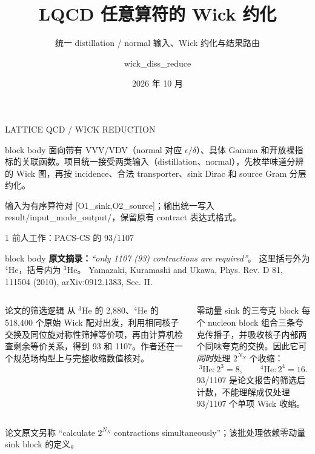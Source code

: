\documentclass[aspectratio=169,UTF8,fontset=fandol]{ctexbeamer}
\title{LQCD 任意算符的 Wick 约化}
\subtitle{统一 distillation / normal 输入、Wick 约化与结果路由}
\author{wick\_diss\_reduce}
\date{2026 年 10 月}
\newcommand{\smallnote}[1]{{\scriptsize\color{Muted}#1}}
\begin{document}
\begin{frame}[plain]
\vspace{0.75cm}
{\color{Teal}\small LATTICE QCD \quad / \quad WICK REDUCTION}\par
\vspace{0.45cm}
{\color{Ink}\inserttitle\par}
\vspace{0.25cm}
{\color{Muted}\insertsubtitle\par}
\vspace{0.65cm}
\begin{beamercolorbox}[sep=0.7em,wd=\linewidth]{block body}
面向带有 VVV/VDV（normal 对应 \(\epsilon/\delta\)）、具体 Gamma 和开放裸指标的关联函数。项目统一接受两类输入（distillation、normal），先枚举味道分辨的 Wick 图，再按 incidence、合法 transporter、sink Dirac 和 source Gram 分层约化。
\end{beamercolorbox}
\vfill
\smallnote{输入为有序算符对 [O1\_sink,O2\_source]；输出统一写入 result/input\_mode\_output/，保留原有 contract 表达式格式。}
\end{frame}
\begin{frame}{1 前人工作：PACS-CS 的 93/1107}
\small
\begin{beamercolorbox}[sep=0.55em,wd=\linewidth]{block body}
\textbf{原文摘录：}\textit{``only 1107 (93) contractions are required''}。
这里括号外为 \({}^4\mathrm{He}\)，括号内为 \({}^3\mathrm{He}\)。
\smallnote{Yamazaki, Kuramashi and Ukawa, Phys. Rev. D 81, 111504 (2010), arXiv:0912.1383, Sec. II.}
\end{beamercolorbox}
\vspace{0.3em}
\begin{columns}[T,onlytextwidth]
\begin{block}{论文的筛选逻辑}
\small
从 \({}^3\mathrm{He}\) 的 2,880、\({}^4\mathrm{He}\) 的 518,400 个原始 Wick 配对出发，利用相同核子交换及同位旋对称性筛掉等价项，再由计算机检查剩余等价关系，得到 93 和 1107。作者还在一个规范场构型上与完整收缩数值核对。
\end{block}
\begin{block}{零动量 sink 的三夸克 block}
\small
每个 nucleon block 组合三条夸克传播子，并吸收核子内部两个同味夸克的交换。因此它可\textit{同时}处理 \(2^{N_N}\) 个收缩：
\[
{}^3\mathrm{He}: 2^3=8,\qquad {}^4\mathrm{He}: 2^4=16.
\]
93/1107 是论文报告的筛选后计数，不能理解成仅处理 93/1107 个单项 Wick 收缩。
\end{block}
\end{columns}
\vspace{0.2em}
\smallnote{论文原文另称 ``calculate \(2^{N_N}\) contractions simultaneously''；该批处理依赖零动量 sink block 的定义。}
\end{frame}
\end{document}
